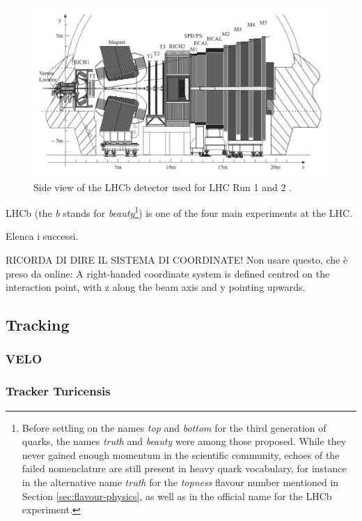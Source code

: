 \begin{figure}[t]
	\centering
	\includegraphics[width=\textwidth]{graphics/02-lhcb/lhcb_diagram.png}
	\caption[LHCb detector side view.]{Side view of the LHCb detector used for LHC Run 1 and 2 \cite{Antunes-Nobrega:630827}.}
	\label{fig:2:lhcb_diagram}
\end{figure}

LHCb (the \textit{b} stands for \textit{beauty}\footnote{Before settling on the names \textit{top} and \textit{bottom} for the third generation of quarks, the names \textit{truth} and \textit{beauty} were among those proposed. While they never gained enough momentum in the scientific community, echoes of the failed nomenclature are still present in heavy quark vocabulary, for instance in the alternative name \textit{truth} for the \textit{topness} flavour number mentioned in Section \ref{sec:flavour-physics}, as well as in the official name for the LHCb experiment.}) is one of the four main experiments at the LHC.

Elenca i successi.

\label{info:LHCb_system}
RICORDA DI DIRE IL SISTEMA DI COORDINATE!
Non usare questo, che è preso da online:
A right-handed coordinate system is defined centred on the interaction point, with z along the beam axis and y pointing upwards.

\subsection{Tracking}

\subsubsection{VELO}

\subsubsection{Tracker Turicensis}

